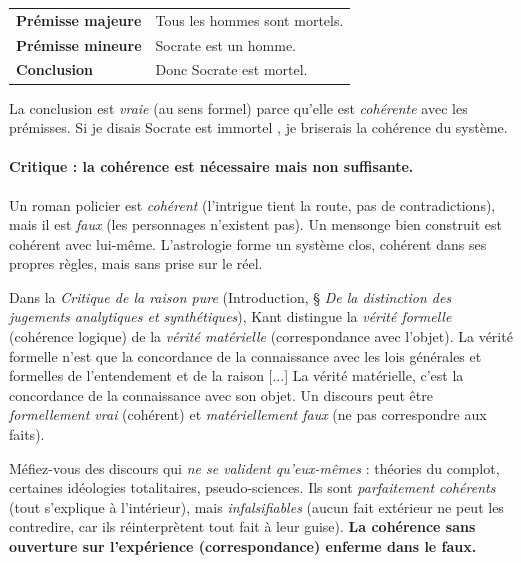 \documentclass[11pt]{article}
\newcommand{\cle}[1]{{\popxbold\color{popdark}#1}}
\begin{document}
\begin{exemplebox}
\begin{center}
\begin{tabularx}{\linewidth}{|l|X|}
\hline
\textbf{Prémisse majeure} & Tous les hommes sont mortels. \\
\textbf{Prémisse mineure} & Socrate est un homme. \\
\textbf{Conclusion} & Donc Socrate est mortel. \\
\hline
\end{tabularx}
\end{center}
La conclusion est \emph{vraie} (au sens formel) parce qu'elle est \emph{cohérente} avec les prémisses. Si je disais \guillemotleft Socrate est immortel \guillemotright, je briserais la cohérence du système.
\end{exemplebox}

\paragraph{Critique : la cohérence est nécessaire mais non suffisante.}
Un roman policier est \emph{cohérent} (l'intrigue tient la route, pas de contradictions), mais il est \emph{faux} (les personnages n'existent pas). Un \cle{mensonge bien construit} est cohérent avec lui-même. L'\cle{astrologie} forme un système clos, cohérent dans ses propres règles, mais sans prise sur le réel.

\begin{propriete}
Dans la \emph{Critique de la raison pure} (Introduction, § \emph{De la distinction des jugements analytiques et synthétiques}), Kant distingue la \emph{vérité formelle} (cohérence logique) de la \emph{vérité matérielle} (correspondance avec l'objet). \guillemotleft La vérité formelle n'est que la concordance de la connaissance avec les lois générales et formelles de l'entendement et de la raison [...] La vérité matérielle, c'est la concordance de la connaissance avec son objet. \guillemotright Un discours peut être \emph{formellement vrai} (cohérent) et \emph{matériellement faux} (ne pas correspondre aux faits).
\end{propriete}

\begin{attention}
Méfiez-vous des discours qui \emph{ne se valident qu'eux-mêmes} : théories du complot, certaines idéologies totalitaires, pseudo-sciences. Ils sont \emph{parfaitement cohérents} (tout s'explique à l'intérieur), mais \emph{infalsifiables} (aucun fait extérieur ne peut les contredire, car ils réinterprètent tout fait à leur guise). \textbf{La cohérence sans ouverture sur l'expérience (correspondance) enferme dans le faux.}
\end{attention}
\end{document}
